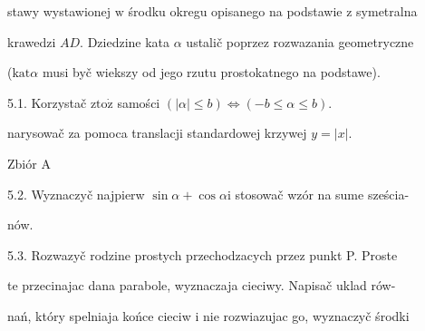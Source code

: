 \documentclass[a4paper,12pt]{article}
\begin{document}
stawy wystawionej $\mathrm{w}$ środku okregu opisanego na podstawie $\mathrm{z}$ symetralna

krawedzi $AD$. Dziedzine kata $\alpha$ ustalič poprzez rozwazania geometryczne

($\mathrm{k}\mathrm{a}\mathrm{t}\alpha$ musi byč wiekszy od jego rzutu prostokatnego na podstawe).

5.1. Korzystač $\mathrm{z} \mathrm{t}\mathrm{o}\dot{\mathrm{z}}$ samości $(|\alpha|\leq b) \Leftrightarrow (-b\leq\alpha\leq b)$.

narysowač za pomoca translacji standardowej krzywej $y=|x|.$

Zbiór A

5.2. Wyznaczyč najpierw $\sin\alpha+\cos\alpha \mathrm{i}$ stosowač wzór na sume sześcia-

nów.

5.3. Rozwazyč rodzine prostych przechodzacych przez punkt P. Proste

te przecinajac dana parabole, wyznaczaja cieciwy. Napisač uklad rów-

nań, który spelniaja końce cieciw i nie rozwiazujac go, wyznaczyč środki
\end{document}
